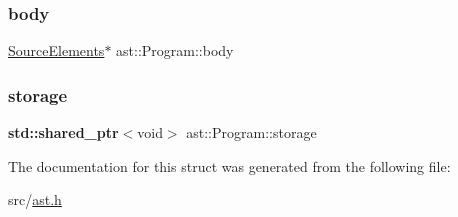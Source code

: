 \subsubsection{\texorpdfstring{body}{body}}
{\footnotesize\ttfamily \hyperlink{structast_1_1_source_elements}{Source\+Elements}$\ast$ ast\+::\+Program\+::body}

\mbox{\label{structast_1_1_program_ad48184fda7dfd12b8f6efa5214a19a26}} 
\subsubsection{\texorpdfstring{storage}{storage}}
{\footnotesize\ttfamily \textbf{ std\+::shared\+\_\+ptr}$<$void$>$ ast\+::\+Program\+::storage}



The documentation for this struct was generated from the following file\+:\begin{DoxyCompactItemize}
\item 
src/\hyperlink{ast_8h}{ast.\+h}\end{DoxyCompactItemize}
